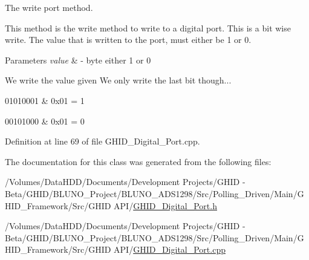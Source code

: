 \-The write port method. 

\-This method is the write method to write to a digital port. \-This is a bit wise write. \-The value that is written to the port, must either be 1 or 0.


\begin{DoxyParams}{\-Parameters}
{\em value} & -\/ byte either 1 or 0 \\
\hline
\end{DoxyParams}
\-We write the value given \-We only write the last bit though...
\begin{DoxyItemize}
\item 01010001 \& 0x01 = 1
\item 00101000 \& 0x01 = 0 
\end{DoxyItemize}

\-Definition at line 69 of file \-G\-H\-I\-D\-\_\-\-Digital\-\_\-\-Port.\-cpp.



\-The documentation for this class was generated from the following files\-:\begin{DoxyCompactItemize}
\item 
/\-Volumes/\-Data\-H\-D\-D/\-Documents/\-Development Projects/\-G\-H\-I\-D -\/ Beta/\-G\-H\-I\-D/\-B\-L\-U\-N\-O\-\_\-\-Project/\-B\-L\-U\-N\-O\-\_\-\-A\-D\-S1298/\-Src/\-Polling\-\_\-\-Driven/\-Main/\-G\-H\-I\-D\-\_\-\-Framework/\-Src/\-G\-H\-I\-D A\-P\-I/\hyperlink{_g_h_i_d___digital___port_8h}{\-G\-H\-I\-D\-\_\-\-Digital\-\_\-\-Port.\-h}\item 
/\-Volumes/\-Data\-H\-D\-D/\-Documents/\-Development Projects/\-G\-H\-I\-D -\/ Beta/\-G\-H\-I\-D/\-B\-L\-U\-N\-O\-\_\-\-Project/\-B\-L\-U\-N\-O\-\_\-\-A\-D\-S1298/\-Src/\-Polling\-\_\-\-Driven/\-Main/\-G\-H\-I\-D\-\_\-\-Framework/\-Src/\-G\-H\-I\-D A\-P\-I/\hyperlink{_g_h_i_d___digital___port_8cpp}{\-G\-H\-I\-D\-\_\-\-Digital\-\_\-\-Port.\-cpp}\end{DoxyCompactItemize}
